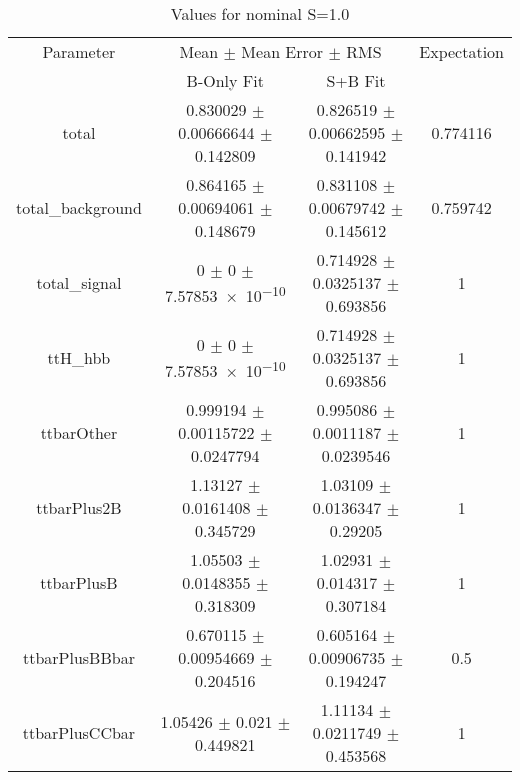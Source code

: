 \begin{table}
\centering
\caption{Values for nominal S=1.0}
\begin{tabular}{cccc}
\toprule
Parameter & \multicolumn{2}{c}{Mean $\pm$ Mean Error $\pm$ RMS} & Expectation\\
 & B-Only Fit & S+B Fit & \\
\midrule
total & \num{0.830029} $\pm$ \num{0.00666644} $\pm$ \num{0.142809} & \num{0.826519} $\pm$ \num{0.00662595} $\pm$ \num{0.141942} & \num{0.774116}\\
total\_background & \num{0.864165} $\pm$ \num{0.00694061} $\pm$ \num{0.148679} & \num{0.831108} $\pm$ \num{0.00679742} $\pm$ \num{0.145612} & \num{0.759742}\\
total\_signal & \num{0} $\pm$ \num{0} $\pm$ \num{7.57853e-10} & \num{0.714928} $\pm$ \num{0.0325137} $\pm$ \num{0.693856} & \num{1}\\
ttH\_hbb & \num{0} $\pm$ \num{0} $\pm$ \num{7.57853e-10} & \num{0.714928} $\pm$ \num{0.0325137} $\pm$ \num{0.693856} & \num{1}\\
ttbarOther & \num{0.999194} $\pm$ \num{0.00115722} $\pm$ \num{0.0247794} & \num{0.995086} $\pm$ \num{0.0011187} $\pm$ \num{0.0239546} & \num{1}\\
ttbarPlus2B & \num{1.13127} $\pm$ \num{0.0161408} $\pm$ \num{0.345729} & \num{1.03109} $\pm$ \num{0.0136347} $\pm$ \num{0.29205} & \num{1}\\
ttbarPlusB & \num{1.05503} $\pm$ \num{0.0148355} $\pm$ \num{0.318309} & \num{1.02931} $\pm$ \num{0.014317} $\pm$ \num{0.307184} & \num{1}\\
ttbarPlusBBbar & \num{0.670115} $\pm$ \num{0.00954669} $\pm$ \num{0.204516} & \num{0.605164} $\pm$ \num{0.00906735} $\pm$ \num{0.194247} & \num{0.5}\\
ttbarPlusCCbar & \num{1.05426} $\pm$ \num{0.021} $\pm$ \num{0.449821} & \num{1.11134} $\pm$ \num{0.0211749} $\pm$ \num{0.453568} & \num{1}\\
\bottomrule
\end{tabular}
\end{table}